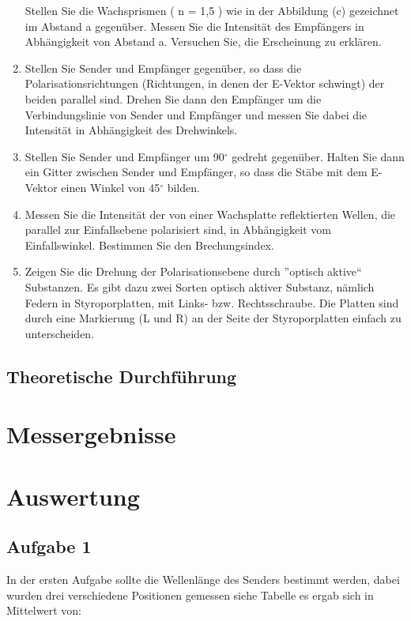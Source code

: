 \documentclass[12pt]{scrartcl}
\begin{document}
\begin{enumerate}
Stellen Sie die Wachsprismen ( n = 1,5 ) wie in der Abbildung (c) gezeichnet im Abstand a gegenüber. Messen Sie die Intensität des Empfängers in Abhängigkeit von Abstand a. Versuchen Sie, die Erscheinung zu erklären.
\item Stellen Sie Sender und Empfänger gegenüber, so dass die Polarisationsrichtungen
(Richtungen, in denen der E-Vektor schwingt) der beiden parallel sind. Drehen Sie dann den Empfänger um die Verbindungslinie von Sender und Empfänger und messen Sie dabei die Intensität in Abhängigkeit des Drehwinkels.
\item Stellen Sie Sender und Empfänger um 90$^{\circ}$ gedreht gegenüber. Halten Sie dann ein Gitter zwischen Sender und Empfänger, so dass die Stäbe mit dem E-Vektor einen Winkel von 45$^{\circ}$ bilden.
\item Messen Sie die Intensität der von einer Wachsplatte reflektierten Wellen, die parallel zur Einfallsebene polarisiert sind, in Abhängigkeit vom Einfallswinkel. Bestimmen Sie den Brechungsindex.
\item Zeigen Sie die Drehung der Polarisationsebene durch ”optisch aktive“ Substanzen. Es gibt dazu zwei Sorten optisch aktiver Substanz, nämlich Federn in Styroporplatten, mit Links- bzw. Rechtsschraube. Die Platten sind durch eine Markierung (L und R) an der Seite der Styroporplatten einfach zu unterscheiden.
\end{enumerate}

\subsection{Theoretische Durchführung}


\section{Messergebnisse}



\section{Auswertung}

\subsection{Aufgabe 1}
In der ersten Aufgabe sollte die Wellenlänge des Senders bestimmt werden, dabei wurden drei verschiedene Positionen gemessen siehe Tabelle  %
es ergab sich in Mittelwert von:
\end{document}
